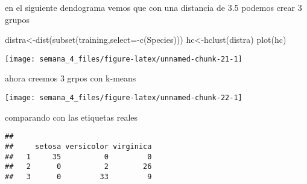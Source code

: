 \documentclass[
]{article}
\newenvironment{Shaded}{\begin{snugshade}}{\end{snugshade}}
\newcommand{\AttributeTok}[1]{\textcolor[rgb]{0.77,0.63,0.00}{#1}}
\newcommand{\DecValTok}[1]{\textcolor[rgb]{0.00,0.00,0.81}{#1}}
\newcommand{\FunctionTok}[1]{\textcolor[rgb]{0.00,0.00,0.00}{#1}}
\newcommand{\NormalTok}[1]{#1}
\newcommand{\OtherTok}[1]{\textcolor[rgb]{0.56,0.35,0.01}{#1}}
\newcommand{\SpecialCharTok}[1]{\textcolor[rgb]{0.00,0.00,0.00}{#1}}
\begin{document}
en el siguiente dendograma vemos que con una distancia de 3.5 podemos
crear 3 grupos

\begin{Shaded}
\begin{Highlighting}[]
\NormalTok{distra}\OtherTok{\textless{}{-}}\FunctionTok{dist}\NormalTok{(}\FunctionTok{subset}\NormalTok{(training,}\AttributeTok{select=}\SpecialCharTok{{-}}\FunctionTok{c}\NormalTok{(Species)))}
\NormalTok{hc}\OtherTok{\textless{}{-}}\FunctionTok{hclust}\NormalTok{(distra)}
\FunctionTok{plot}\NormalTok{(hc)}
\end{Highlighting}
\end{Shaded}

\begin{center}\texttt{[image: semana\_4\_files/figure-latex/unnamed-chunk-21-1]} \end{center}

ahora creemos 3 grpos con k-means

\begin{Shaded}
\end{Shaded}

\begin{center}\texttt{[image: semana\_4\_files/figure-latex/unnamed-chunk-22-1]} \end{center}

comparando con las etiquetas reales

\begin{Shaded}
\end{Shaded}

\begin{verbatim}
##    
##     setosa versicolor virginica
##   1     35          0         0
##   2      0          2        26
##   3      0         33         9
\end{verbatim}
\end{document}
